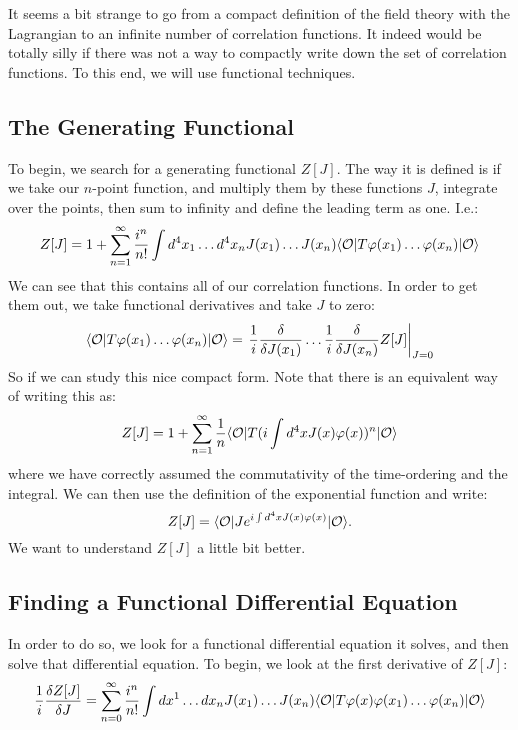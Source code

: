 It seems a bit strange to go from a compact definition of the field theory with the Lagrangian to an infinite number of correlation functions. It indeed would be totally silly if there was not a way to compactly write down the set of correlation functions. To this end, we will use functional techniques.

\subsection{The Generating Functional}
To begin, we search for a generating functional $Z[J]$. The way it is defined is if we take our $n$-point function, and multiply them by these functions $J$, integrate over the points, then sum to infinity and define the leading term as one. I.e.:
\begin{equation}
    Z[J] = 1 + \sum_{n=1}^\infty \frac{i^n}{n!}\int d^4x_1 \ldots d^4x_n J(x_1)\ldots J(x_n)\bra{\O}T\varphi(x_1) \ldots \varphi(x_n)\ket{\O}
\end{equation}
We can see that this contains all of our correlation functions. In order to get them out, we take functional derivatives and take $J$ to zero:
\begin{equation}
    \bra{\O}T\varphi(x_1) \ldots \varphi(x_n)\ket{\O} = \left.\frac{1}{i}\frac{\delta}{\delta J(x_1)} \ldots \frac{1}{i}\frac{\delta}{\delta J(x_n)}Z[J]\right|_{J=0}
\end{equation}
So if we can study this nice compact form. Note that there is an equivalent way of writing this as:
\begin{equation}
    Z[J] = 1 + \sum_{n=1}^\infty \frac{1}{n}\bra{\O}T(i\int d^4x J(x)\varphi(x))^n \ket{\O}
\end{equation}
where we have correctly assumed the commutativity of the time-ordering and the integral. We can then use the definition of the exponential function and write:
\begin{equation}
    Z[J] = \bra{\O}Je^{i\int d^4x J(x)\varphi(x)}\ket{\O}.
\end{equation}
We want to understand $Z[J]$ a little bit better.

\subsection{Finding a Functional Differential Equation}
In order to do so, we look for a functional differential equation it solves, and then solve that differential equation. To begin, we look at the first derivative of $Z[J]$:
\begin{equation}
    \frac{1}{i}\frac{\delta Z[J]}{\delta J} = \sum_{n=0}^\infty \frac{i^n}{n!}\int dx^1 \ldots dx_n J(x_1) \ldots J(x_n) \bra{\O}T\varphi(x)\varphi(x_1) \ldots \varphi(x_n)\ket{\O}
\end{equation}

